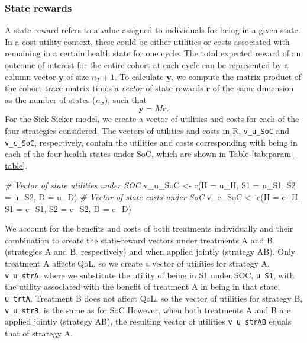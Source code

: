 \documentclass[
]{article}
\newenvironment{Shaded}{\begin{snugshade}}{\end{snugshade}}
\newcommand{\AttributeTok}[1]{\textcolor[rgb]{0.77,0.63,0.00}{#1}}
\newcommand{\CommentTok}[1]{\textcolor[rgb]{0.56,0.35,0.01}{\textit{#1}}}
\newcommand{\FunctionTok}[1]{\textcolor[rgb]{0.00,0.00,0.00}{#1}}
\newcommand{\NormalTok}[1]{#1}
\newcommand{\OtherTok}[1]{\textcolor[rgb]{0.56,0.35,0.01}{#1}}
\begin{document}
\hypertarget{state-rewards}{%
\subsubsection{State rewards}\label{state-rewards}}

A state reward refers to a value assigned to individuals for being in a given state. In a cost-utility context, these could be either utilities or costs associated with remaining in a certain health state for one cycle. The total expected reward of an outcome of interest for the entire cohort at each cycle can be represented by a column vector \(\mathbf{y}\) of size \(n_T+1\). To calculate \(\mathbf{y}\), we compute the matrix product of the cohort trace matrix times a \emph{vector} of state rewards \(\mathbf{r}\) of the same dimension as the number of states (\(n_S\)), such that
\begin{equation}
  \mathbf{y} = M\mathbf{r}.
  \label{eq:exp-rew-cycle}
\end{equation}
For the Sick-Sicker model, we create a vector of utilities and costs for each of the four strategies considered. The vectors of utilities and costs in R, \texttt{v\_u\_SoC} and \texttt{v\_c\_SoC}, respectively, contain the utilities and costs corresponding with being in each of the four health states under SoC, which are shown in Table \ref{tab:param-table}.

\begin{Shaded}
\begin{Highlighting}[]
\CommentTok{\# Vector of state utilities under SOC}
\NormalTok{v\_u\_SoC }\OtherTok{\textless{}{-}} \FunctionTok{c}\NormalTok{(}\AttributeTok{H =}\NormalTok{ u\_H, }\AttributeTok{S1 =}\NormalTok{ u\_S1, }\AttributeTok{S2 =}\NormalTok{ u\_S2, }\AttributeTok{D =}\NormalTok{ u\_D)}
\CommentTok{\# Vector of state costs under SoC}
\NormalTok{v\_c\_SoC }\OtherTok{\textless{}{-}} \FunctionTok{c}\NormalTok{(}\AttributeTok{H =}\NormalTok{ c\_H, }\AttributeTok{S1 =}\NormalTok{ c\_S1, }\AttributeTok{S2 =}\NormalTok{ c\_S2, }\AttributeTok{D =}\NormalTok{ c\_D)}
\end{Highlighting}
\end{Shaded}

We account for the benefits and costs of both treatments individually and their combination to create the state-reward vectors under treatments A and B (strategies A and B, respectively) and when applied jointly (strategy AB). Only treatment A affects QoL, so we create a vector of utilities for strategy A, \texttt{v\_u\_strA}, where we substitute the utility of being in S1 under SOC, \texttt{u\_S1}, with the utility associated with the benefit of treatment A in being in that state, \texttt{u\_trtA}. Treatment B does not affect QoL, so the vector of utilities for strategy B, \texttt{v\_u\_strB}, is the same as for SoC However, when both treatments A and B are applied jointly (strategy AB), the resulting vector of utilities \texttt{v\_u\_strAB} equals that of strategy A.
\end{document}
